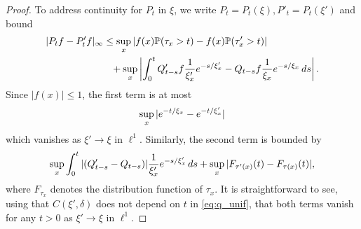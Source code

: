 \documentclass[11pt,a4paper]{scrartcl}
\numberwithin{equation}{section}
\theoremstyle{plain}
\theoremstyle{definition}
\theoremstyle{remark}
\newcommand{\bN}{\ensuremath{\mathbb{N}}}
\newcommand{\bP}{\ensuremath{\mathbb{P}}}
\newcommand{\ind}{\ensuremath{\mathbbm{1}}}
\newcommand{\di}{\,\textup{d}}
\begin{document}
\begin{proof}
To address continuity for $P_t$ in $\xi$, we write $P_t=P_t(\xi), P'_t=P_t(\xi')$ and bound
\begin{equation}
	\begin{aligned}
	|P_tf-P'_tf|_\infty &\leq \sup_x |f(x)\bP(\tau_x>t)-f(x)\bP(\tau'_x>t)| \\
	& \phantom{=} + \sup_x\left|\int_0^t Q'_{t-s}f\frac{1}{\xi'_x}\textup{e}^{-s/\xi'_x}-Q_{t-s}f\frac{1}{\xi_x}\textup{e}^{-s/\xi_x} \di s \right|.  
	\end{aligned}
\end{equation}
Since $|f(x)|\leq 1$, the first term is at most $$\sup_{x}|\textup{e}^{-t/\xi_x}-\textup{e}^{-t/\xi'_x}|$$ which vanishes as $\xi'\to\xi$ in $\ell^1$. Similarly, the second term is bounded by
\begin{equation}
	\begin{aligned}
		 \sup_x \int_{0}^t |(Q'_{t-s}-Q_{t-s})| \frac{1}{\xi'_x}\textup{e}^{-s/\xi'_x}\di s + \sup_x |F_{\tau'(x)}(t)-F_{\tau(x)}(t)|, 
	\end{aligned}
\end{equation}
where $F_{\tau_x}$ denotes the distribution function of $\tau_x$. It is straightforward to see, using that $C(\xi',\delta)$ does not depend on $t$ in \eqref{eq:q_unif}, that both terms vanish for any $t>0$ as $\xi'\to\xi$ in $\ell^1$.
\end{proof}
\end{document}
